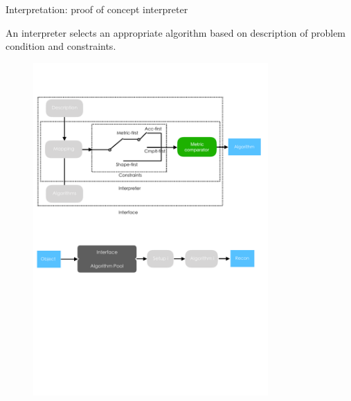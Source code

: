 \documentclass[10pt]{beamer}
\begin{document}
\begin{frame}{Interpretation: proof of concept interpreter}

An interpreter selects an appropriate algorithm based on description of problem condition and constraints.

\begin{figure}[!htbp]
\centering
\includegraphics[width=0.8\textwidth]{interp/interpreter.pdf}
\end{figure}

\end{frame}
\end{document}
